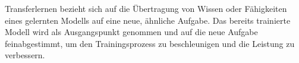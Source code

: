 Transferlernen bezieht sich auf die Übertragung von Wissen oder Fähigkeiten
eines gelernten Modells auf eine neue, ähnliche Aufgabe. Das bereits trainierte
Modell wird als Ausgangspunkt genommen und auf die neue Aufgabe feinabgestimmt,
um den Trainingsprozess zu beschleunigen und die Leistung zu verbessern.